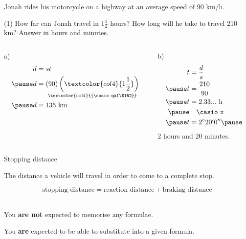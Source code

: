 \documentclass[aspectratio=169,10pt]{beamer}
\begin{document}
\begin{frame}
  \begin{example}
    Jonah rides his motorcycle on a highway at an average speed of 90 km/h.
    \begin{tasks}(1)
      \task How far can Jonah travel in $1\frac{1}{2}$ hours?
      \task How long will he take to travel 210 km? Answer in hours and minutes.
    \end{tasks}
  \end{example}\pause
  \begin{solution}[]
  \vspace{-1em}
  \begin{columns}[t]
      \begin{column}{.44\textwidth}
        a)\vspace{-1em}
        \[
        \begin{aligned}
          d&=st\\\pause
          d&=\underset{\text{\textcolor{col4}{{\casio qa1\$1R2}}}}{(90)\left(\textcolor{col4}{1\frac{1}{2}}\right)}\\\pause
          d&=135\text{ km}
        \end{aligned}
        \]
      \end{column}
      \begin{column}{.44\textwidth}
        b)\vspace{-1em}
        \[
        \begin{aligned}
          t&=\frac{d}{s}\\\pause
          t&=\frac{210}{90}\\\pause
          t&=2.33...\text{ h}\\\pause
          &\quad\text{\casio x}\\\pause
          t&=2^\circ 20' 0''\pause
        \end{aligned}
        \]
        2 hours and 20 minutes.
      \end{column}
  \end{columns}
  \end{solution}
\end{frame}

\begin{frame}{Stopping distance}
    \begin{definition}
    The distance a vehicle will travel in order to come to a complete stop.
    \end{definition}\pause
    $$\text{stopping distance}=\text{reaction distance}+\text{braking distance}$$\\\pause\vspace{1em}
    \begin{important}
    You \textbf{are not} expected to memorise any formulae.\pause
    
    You \textbf{are} expected to be able to substitute into a given formula.
    \end{important}
\end{frame}
\end{document}
